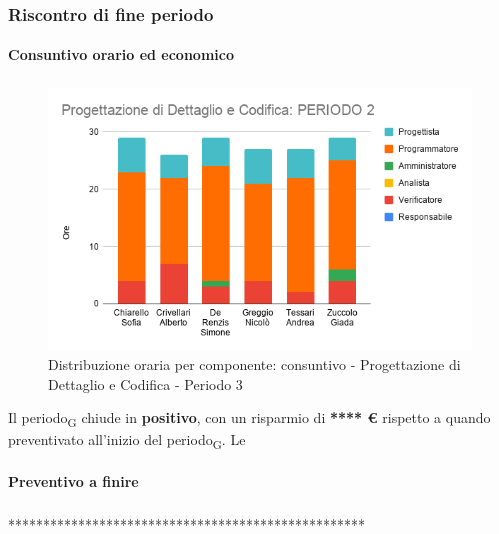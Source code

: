 \subsubsection{Riscontro di fine periodo}



\paragraph{Consuntivo orario ed economico}
\subparagraph*{}

\contabilitaTable{
	
}

\begin{figure}[H]
	\centering
	\includegraphics[scale=0.6]{res/images/charts/consuntivo/prog_dett_2.png}
	\caption{Distribuzione oraria per componente: consuntivo - Progettazione di Dettaglio e Codifica - Periodo 3}
\end{figure}


Il periodo\textsubscript{G} chiude in \textbf{positivo}, con un risparmio di \textbf{**** \euro} rispetto a quando preventivato all'inizio del periodo\textsubscript{G}. Le 


\paragraph{Preventivo a finire}
\subparagraph*{}

\pafTable{
	
}

***************************************************

